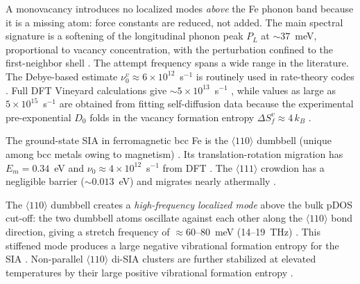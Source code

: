 \documentclass[pdflatex,sn-basic]{sn-jnl} %
\begin{document}
A monovacancy introduces no localized modes \emph{above} the Fe phonon
band because it is a missing atom: force constants are reduced, not
added.
The main spectral signature is a softening of the longitudinal phonon
peak $P_L$ at $\sim\!37$~meV, proportional to vacancy concentration,
with the perturbation confined to the first-neighbor shell
\cite{Seibt2020}. The attempt frequency spans a wide range in the literature.
The Debye-based estimate $\nu_0^v \approx 6\times10^{12}$~s$^{-1}$ is
routinely used in rate-theory codes \cite{Ghoniem1983,Was2017}.
Full DFT Vineyard calculations give $\sim\!5\times10^{13}$~s$^{-1}$
\cite{Fu2004}, while values as large as $5\times10^{15}$~s$^{-1}$ are
obtained from fitting self-diffusion data \cite{Soisson2007} because
the experimental pre-exponential $D_0$ folds in the vacancy formation
entropy $\Delta S_f^v \approx 4\,k_B$ \cite{Lucas2009}.

The ground-state SIA in ferromagnetic bcc Fe is the $\langle110\rangle$
dumbbell (unique among bcc metals owing to magnetism) \cite{Nguyen2006}.
Its translation-rotation migration has $E_m = 0.34$~eV and $\nu_0 \approx
4\times10^{12}$~s$^{-1}$ from DFT \cite{Fu2004,Domain2001}.
The $\langle111\rangle$ crowdion has a negligible barrier
($\sim\!0.013$~eV) and migrates nearly athermally \cite{Nguyen2006}.

The $\langle110\rangle$ dumbbell creates a \emph{high-frequency localized
mode} above the bulk pDOS cut-off: the two dumbbell atoms oscillate
against each other along the $\langle110\rangle$ bond direction, giving
a stretch frequency of $\approx60$--$80$~meV (14--19~THz)
\cite{Domain2001,Willaime2005}.
This stiffened mode produces a large negative vibrational formation
entropy for the SIA \cite{Derlet2007}.
Non-parallel $\langle110\rangle$ di-SIA clusters are further stabilized
at elevated temperatures by their large positive vibrational formation
entropy \cite{Terentyev2008}.
\end{document}

